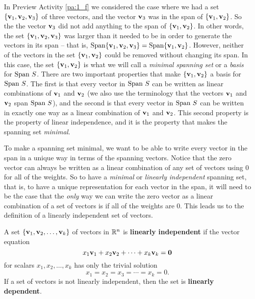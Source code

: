 In Preview Activity \ref{pa:1_f} we considered the case where we had a set $\{\mathbf{v}_1, \mathbf{v}_2, \mathbf{v}_3\}$ of three vectors, and the vector $\mathbf{v}_3$ was in the span of $\{\mathbf{v}_1, \mathbf{v}_2\}$. So the the vector $\mathbf{v}_3$ did not add anything to the span of $\{\mathbf{v}_1, \mathbf{v}_2\}$. In other words, the set $\{\mathbf{v}_1, \mathbf{v}_2, \mathbf{v}_3\}$ was larger than it needed to be in order to generate the vectors in its span -- that is, $\text{Span}\{\mathbf{v}_1, \mathbf{v}_2, \mathbf{v}_3\} = \text{Span} \{\mathbf{v}_1, \mathbf{v}_2\}$. However, neither of the vectors in the set $\{\mathbf{v}_1, \mathbf{v}_2\}$ could be removed without changing its span. In this case, the set $\{\mathbf{v}_1, \mathbf{v}_2\}$ is what we will call a \emph{minimal spanning set} or a \emph{basis} for $\text{Span} \ S$. There are two important properties that make $\{\mathbf{v}_1, \mathbf{v}_2\}$ a basis for $\text{Span} \ S$. The first is that every vector in $\text{Span} \ S$ can be written as linear combinations of $\mathbf{v}_1$ and $\mathbf{v}_2$ (we also use the terminology that the vectors $\mathbf{v}_1$ and $\mathbf{v}_2$ span $\text{Span} \ S$), and the second is that every vector in $\text{Span} \ S$ can be written in exactly one way as a linear combination of $\mathbf{v}_1$ and $\mathbf{v}_2$. This second property is the property of linear independence, and it is the property that makes the spanning set \emph{minimal}. 

To make a spanning set minimal, we want to be able to write every vector in the span in a unique way in terms of the spanning vectors. Notice that the zero vector can always be written as a linear combination of any set of vectors using 0 for all of the weights. So to have a \emph{minimal} or \emph{linearly independent} spanning set, that is, to have a unique representation for each vector in the span, it will need to be the case that the \emph{only} way we can write the zero vector as a linear combination of a set of vectors is if all of the weights are 0. This leads us to the definition of a linearly independent set of vectors.  


\begin{definition} \label{def:linear_independence_Rn} A set $\{\mathbf{v}_1, \mathbf{v}_2, \ldots, \mathbf{v}_k\}$ of vectors in $\mathbb{R}^n$ is \textbf{linearly independent} if the vector equation
\[x_1 \mathbf{v}_1 + x_2 \mathbf{v}_2 + \cdots + x_k \mathbf{v}_k = \mathbf{0}\]
for scalars $x_1, x_2, \ldots, x_k$ has only the trivial solution
\[x_1 = x_2 = x_3 = \cdots = x_k = 0.\]
If a set of vectors is not linearly independent, then the set is \textbf{linearly dependent}.
\end{definition}

